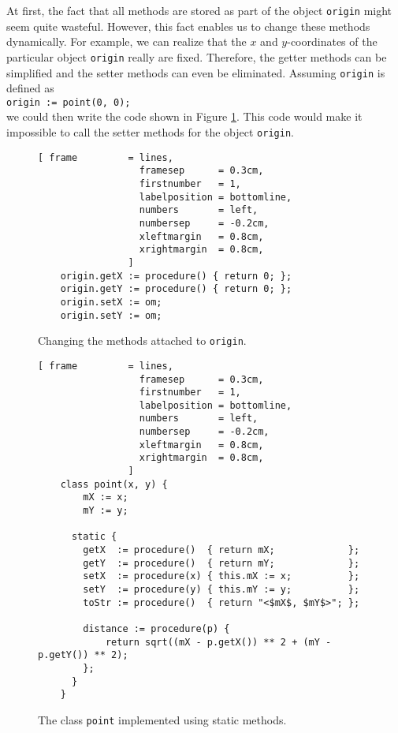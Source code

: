 At first, the fact that all methods are stored as part of the object \texttt{origin} might seem quite
wasteful.  However, this fact enables us to change these methods dynamically.  For example, we can
realize that the $x$ and $y$-coordinates of the particular object \texttt{origin} really are fixed.
Therefore, the getter methods can be 
simplified and the setter methods can even be eliminated.  Assuming \texttt{origin} is defined as
\\[0.2cm]
\hspace*{1.3cm}
\texttt{origin := point(0, 0);}
\\[0.2cm]
we could then write the code shown in Figure \ref{fig:point.stlx-origin}.
This code would make it impossible to call the setter methods for the object \texttt{origin}.

\begin{figure}[!ht]
\centering
\begin{Verbatim}[ frame         = lines, 
                  framesep      = 0.3cm, 
                  firstnumber   = 1,
                  labelposition = bottomline,
                  numbers       = left,
                  numbersep     = -0.2cm,
                  xleftmargin   = 0.8cm,
                  xrightmargin  = 0.8cm,
                ]
    origin.getX := procedure() { return 0; };
    origin.getY := procedure() { return 0; };
    origin.setX := om;
    origin.setY := om;
\end{Verbatim}
\vspace*{-0.3cm}
\caption{Changing the methods attached to \texttt{origin}.}
\label{fig:point.stlx-origin}
\end{figure}

\begin{figure}[!htb]
\centering
\begin{Verbatim}[ frame         = lines, 
                  framesep      = 0.3cm, 
                  firstnumber   = 1,
                  labelposition = bottomline,
                  numbers       = left,
                  numbersep     = -0.2cm,
                  xleftmargin   = 0.8cm,
                  xrightmargin  = 0.8cm,
                ]
    class point(x, y) {
        mX := x;
        mY := y;
    
      static {
        getX  := procedure()  { return mX;             };
        getY  := procedure()  { return mY;             };
        setX  := procedure(x) { this.mX := x;          };
        setY  := procedure(y) { this.mY := y;          };
        toStr := procedure()  { return "<$mX$, $mY$>"; };
 
        distance := procedure(p) {
            return sqrt((mX - p.getX()) ** 2 + (mY - p.getY()) ** 2);
        };
      }
    }
\end{Verbatim}
\vspace*{-0.3cm}
\caption{The class \texttt{point} implemented using static methods.}
\label{fig:point-static.stlx}
\end{figure}

